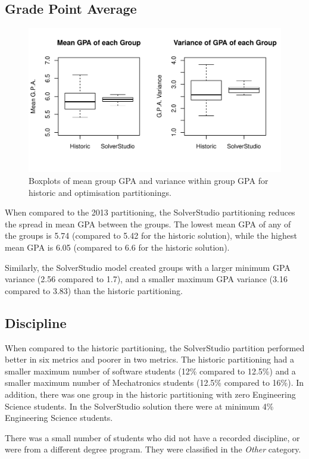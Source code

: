 \documentclass[12pt]{ORSNZ}
\begin{document}
\subsection{Grade Point Average}

\begin{figure}[!ht]
	\centering
	\includegraphics[width=\textwidth]{./gpa_plot.pdf}
	\caption{Boxplots of mean group GPA and variance within group GPA for historic and optimisation partitionings.}
\end{figure}

When compared to the 2013 partitioning, the SolverStudio partitioning reduces the spread in mean GPA between the groups. The lowest mean GPA of any of the groups is 5.74 (compared to 5.42 for the historic solution), while the highest mean GPA is 6.05 (compared to 6.6 for the historic solution). 

Similarly, the SolverStudio model created groups with a larger minimum GPA variance (2.56 compared to 1.7), and a smaller maximum GPA variance (3.16 compared to 3.83) than the historic partitioning.

\subsection{Discipline}
When compared to the historic partitioning, the SolverStudio partition performed better in six metrics and poorer in two metrics. The historic partitioning had a smaller maximum number of software students (12\% compared to 12.5\%) and a smaller maximum number of Mechatronics students (12.5\% compared to 16\%). In addition, there was one group in the historic partitioning with zero Engineering Science students. In the SolverStudio solution there were at minimum 4\% Engineering Science students.

There was a small number of students who did not have a recorded discipline, or were from a different degree program. They were classified in the \emph{Other} category.
\end{document}
